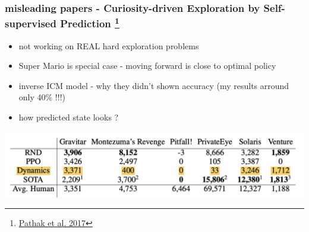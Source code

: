 \documentclass{beamer}
\begin{document}
\begin{frame}
  
  \frametitle{misleading papers - Curiosity-driven Exploration by Self-supervised Prediction \footnote{\href{https://arxiv.org/abs/1705.05363}{Pathak et al. 2017}}}
  
  \begin{itemize}
    \item not working on REAL hard exploration problems
    \item Super Mario is special case - moving forward is close to optimal policy
    \item inverse ICM model - why they didn't shown accuracy (my results arround only 40\% !!!)
    \item how predicted state looks ?
  \end{itemize}

  \centering
  \includegraphics[scale=0.25]{../papers_captions/icm_a.png}

\end{frame}
\end{document}
